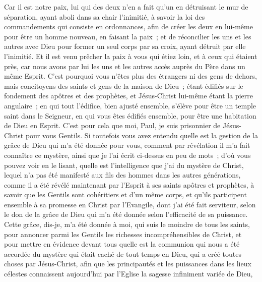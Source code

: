\begin{multicols}{2}
Car il est notre paix, lui qui des deux n'en a fait qu'un en détruisant le mur de séparation,
ayant aboli dans sa chair l'inimitié, à savoir la loi des commandements qui consiste en ordonnances, afin de créer les deux en lui-même pour être un homme nouveau, en faisant la paix~;
et de réconcilier les uns et les autres avec Dieu pour former un seul corps par sa croix, ayant détruit par elle l'inimitié.
Et il est venu prêcher la paix à vous qui étiez loin, et à ceux qui étaient près,
car nous avons par lui les uns et les autres accès auprès du Père dans un même Esprit.
C'est pourquoi vous n'êtes plus des étrangers ni des gens de dehors, mais concitoyens des saints et gens de la maison de Dieu~;
étant édifiés sur le fondement des apôtres et des prophètes, et Jésus-Christ lui-même étant la pierre angulaire~;
en qui tout l'édifice, bien ajusté ensemble, s'élève pour être un temple saint dans le Seigneur,
en qui vous êtes édifiés ensemble, pour être une habitation de Dieu en Esprit.
\VerseOne{}C'est pour cela que moi, Paul, je suis prisonnier de Jésus-Christ pour vous Gentils.
Si toutefois vous avez entendu quelle est la gestion de la grâce de Dieu qui m'a été donnée pour vous,
comment par révélation il m'a fait connaître ce mystère, ainsi que je l'ai écrit ci-dessus en peu de mots~;
d'où vous pouvez voir en le lisant, quelle est l'intelligence que j'ai du mystère de Christ,
lequel n'a pas été manifesté aux fils des hommes dans les autres générations, comme il a été révélé maintenant par l'Esprit à ses saints apôtres et prophètes,
à savoir que les Gentils sont cohéritiers et d'un même corps, et qu'ils participent ensemble à sa promesse en Christ par l'Evangile,
dont j'ai été fait serviteur, selon le don de la grâce de Dieu qui m'a été donnée selon l'efficacité de sa puissance.
Cette grâce, dis-je, m'a été donnée à moi, qui suis le moindre de tous les saints, pour annoncer parmi les Gentils les richesses incompréhensibles de Christ,
et pour mettre en évidence devant tous quelle est la communion qui nous a été accordée du mystère qui était caché de tout temps en Dieu, qui a créé toutes choses par Jésus-Christ,
afin que les principautés et les puissances dans les lieux célestes connaissent aujourd'hui par l'Eglise la sagesse infiniment variée de Dieu,

\end{multicols}
